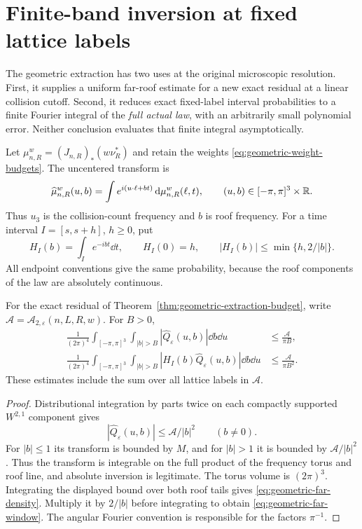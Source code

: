 \section{Finite-band inversion at fixed lattice labels}
\label{sec:microscopic-finite-band}
The geometric extraction has two uses at the original microscopic
resolution. First, it supplies a uniform far-roof estimate for a new
exact residual at a linear collision cutoff. Second, it reduces exact
fixed-label interval probabilities to a finite Fourier integral of the
\emph{full actual law}, with an arbitrarily small polynomial error.
Neither conclusion evaluates that finite integral asymptotically.

Let $\mu_{n,R}^w=(J_{n,R})_*(w\nu_R^*)$ and retain the weights
\eqref{eq:geometric-weight-budgets}. The uncentered transform is
\[
 \widehat\mu_{n,R}^w(u,b)=\int e^{i(u\cdot\ell+bt)}\,\mathrm d\mu_{n,R}^w(\ell,t),
 \qquad (u,b)\in[-\pi,\pi]^3\times\mathbb R.
\]
Thus $u_3$ is the collision-count frequency and $b$ is roof frequency.
For a time interval $I=[s,s+h]$, $h\ge0$, put
\begin{equation}\label{eq:microscopic-interval-transform}
 H_I(b)=\int_Ie^{-ibt}\dd t,
 \qquad H_I(0)=h,
 \qquad |H_I(b)|\le\min\{h,2/|b|\}.
\end{equation}
All endpoint conventions give the same probability, because the roof
components of the law are absolutely continuous.

\begin{proposition}
\label{prop:geometric-far-roof}
For the exact residual of Theorem~\ref{thm:geometric-extraction-budget},
write $\mathcal A=\mathcal A_{2,\varepsilon}(n,L,R,w)$. For $B>0$,
\begin{align}
 \frac1{(2\pi)^4}\int_{[-\pi,\pi]^3}\int_{|b|>B}
                         |\widehat Q_\varepsilon(u,b)|\dd b\dd u
       &\le\frac{\mathcal A}{\pi B},
                 \label{eq:geometric-far-density}\\
 \frac1{(2\pi)^4}\int_{[-\pi,\pi]^3}\int_{|b|>B}
                |H_I(b)\widehat Q_\varepsilon(u,b)|\dd b\dd u
       &\le\frac{\mathcal A}{\pi B^2}.
                 \label{eq:geometric-far-window}
\end{align}
These estimates include the sum over all lattice labels in $\mathcal A$.
\end{proposition}
\begin{proof}
Distributional integration by parts twice on each compactly supported
$W^{2,1}$ component gives
\[
 |\widehat Q_\varepsilon(u,b)|\le\mathcal A/|b|^2\qquad(b\ne0).
\]
For $|b|\le1$ its transform is bounded by $M$, and for $|b|>1$
it is bounded by $\mathcal A/|b|^2$. Thus the transform is integrable
on the full product of the frequency torus and roof line, and absolute
inversion is legitimate. The torus volume is $(2\pi)^3$. Integrating the displayed
bound over both roof tails gives \eqref{eq:geometric-far-density}.
Multiply it by $2/|b|$ before integrating to obtain
\eqref{eq:geometric-far-window}. The angular Fourier convention is
responsible for the factors $\pi^{-1}$.
\end{proof}

